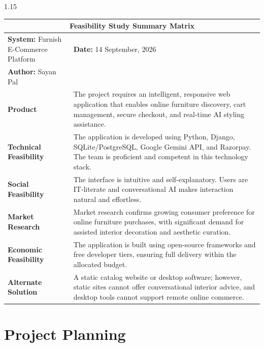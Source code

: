 \documentclass[12pt,a4paper]{article}
\begin{document}
{\begin{spacing}{1.15}
\begin{center}
\renewcommand{\arraystretch}{1.22}
\fontsize{10.5}{14}\selectfont
\begin{tabular}{|p{2.0in}|p{4.5in}|}
\hline
\multicolumn{2}{|c|}{\textbf{\fontsize{11}{15}\selectfont Feasibility Study Summary Matrix}} \\ \hline
\textbf{System:} Furnish E-Commerce Platform & \textbf{Date:} 14 September, 2026 \\ \hline
\textbf{Author:} Sayan Pal &  \\ \hline
\textbf{Product} & The project requires an intelligent, responsive web application that enables online furniture discovery, cart management, secure checkout, and real-time AI styling assistance. \\ \hline
\textbf{Technical Feasibility} & The application is developed using Python, Django, SQLite/PostgreSQL, Google Gemini API, and Razorpay. The team is proficient and competent in this technology stack. \\ \hline
\textbf{Social Feasibility} & The interface is intuitive and self-explanatory. Users are IT-literate and conversational AI makes interaction natural and effortless. \\ \hline
\textbf{Market Research} & Market research confirms growing consumer preference for online furniture purchases, with significant demand for assisted interior decoration and aesthetic curation. \\ \hline
\textbf{Economic Feasibility} & The application is built using open-source frameworks and free developer tiers, ensuring full delivery within the allocated budget. \\ \hline
\textbf{Alternate Solution} & A static catalog website or desktop software; however, static sites cannot offer conversational interior advice, and desktop tools cannot support remote online commerce. \\ \hline
\end{tabular}
\end{center}

\end{spacing}
}

\vfill

\newpage



\section{Project Planning}
\end{document}
